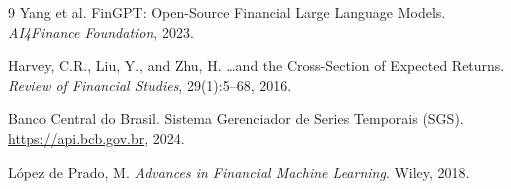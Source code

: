 \documentclass{article}
\begin{document}
\begin{thebibliography}{9}
Yang et al.
\newblock FinGPT: Open-Source Financial Large Language Models.
\newblock \textit{AI4Finance Foundation}, 2023.

Harvey, C.R., Liu, Y., and Zhu, H.
\newblock \ldots and the Cross-Section of Expected Returns.
\newblock \textit{Review of Financial Studies}, 29(1):5--68, 2016.

Banco Central do Brasil.
\newblock Sistema Gerenciador de Series Temporais (SGS).
\newblock \url{https://api.bcb.gov.br}, 2024.

López de Prado, M.
\newblock \textit{Advances in Financial Machine Learning}.
\newblock Wiley, 2018.

\end{thebibliography}
\end{document}
